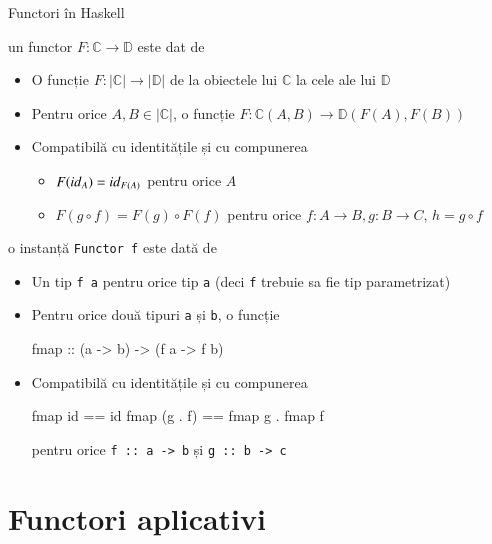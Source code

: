 \documentclass[xcolor=pdftex,romanian,colorlinks]{beamer}
\begin{document}
\begin{frame}[fragile]{Functori în Haskell}

 un functor $F : \mathbb{C} \rightarrow \mathbb{D}$ este dat de
\begin{itemize}
\item O funcție $F : |\mathbb{C}| \rightarrow |\mathbb{D}|$ de la obiectele lui $\mathbb{C}$ la cele ale lui $\mathbb{D}$
\item Pentru orice $A,B \in |\mathbb{C}|$, o funcție $F : \mathbb{C}(A,B) \rightarrow \mathbb{D}(F(A),F(B))$
\item Compatibilă cu identitățile și cu compunerea
\begin{itemize}
\item $F({\it id}_A) = {\it id}_{F(A)}$ pentru orice $A$
\item $F(g\circ f) = F(g)\circ F(f)$ pentru orice $f : A \rightarrow B,g: B \rightarrow C$, $h = g\circ f$
\end{itemize}
\end{itemize}

\vfill
{}
 o instanță \lstinline$Functor f$ este dată de
\begin{itemize}
\item Un tip \lstinline$f a$ pentru orice tip \lstinline$a$ (deci \lstinline$f$ trebuie sa fie tip parametrizat)
\item Pentru orice două tipuri \lstinline$a$ și \lstinline$b$, o funcție 
\begin{asciihs}
fmap :: (a -> b) -> (f a -> f b)
\end{asciihs}
\item Compatibilă cu identitățile și cu compunerea
\begin{asciihs}
fmap id == id
fmap (g . f) == fmap g . fmap f 
\end{asciihs}
\hfill pentru orice \lstinline$f :: a -> b$ și \lstinline$g :: b -> c$
\end{itemize}
\end{frame}


\section{Functori aplicativi}
\end{document}
